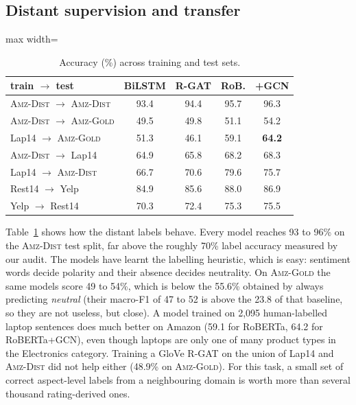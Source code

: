 \documentclass[11pt]{article}
\newcommand{\gold}{\textsc{Amz-Gold}}
\newcommand{\dist}{\textsc{Amz-Dist}}
\begin{document}
\subsection{Distant supervision and transfer}

\begin{table}[t]
\centering
\small
\setlength{\tabcolsep}{3pt}
\begin{adjustbox}{max width=\columnwidth}
\begin{tabular}{lcccc}
\toprule
train $\rightarrow$ test & BiLSTM & R-GAT & RoB. & +GCN \\
\midrule
\dist{} $\rightarrow$ \dist & 93.4 & 94.4 & 95.7 & 96.3 \\
\dist{} $\rightarrow$ \gold & 49.5 & 49.8 & 51.1 & 54.2 \\
Lap14 $\rightarrow$ \gold & 51.3 & 46.1 & 59.1 & \textbf{64.2} \\
\dist{} $\rightarrow$ Lap14 & 64.9 & 65.8 & 68.2 & 68.3 \\
Lap14 $\rightarrow$ \dist & 66.7 & 70.6 & 79.6 & 75.7 \\
\midrule
Rest14 $\rightarrow$ Yelp & 84.9 & 85.6 & 88.0 & 86.9 \\
Yelp $\rightarrow$ Rest14 & 70.3 & 72.4 & 75.3 & 75.5 \\
\bottomrule
\end{tabular}
\end{adjustbox}
\caption{Accuracy (\%) across training and test sets.}
\label{tab:transfer}
\end{table}

Table~\ref{tab:transfer} shows how the distant labels behave. Every model reaches 93 to 96\% on the \dist{} test split, far above the roughly 70\% label accuracy measured by our audit. The models have learnt the labelling heuristic, which is easy: sentiment words decide polarity and their absence decides neutrality. On \gold{} the same models score 49 to 54\%, which is below the 55.6\% obtained by always predicting \textit{neutral} (their macro-F1 of 47 to 52 is above the 23.8 of that baseline, so they are not useless, but close). A model trained on 2,095 human-labelled laptop sentences does much better on Amazon (59.1 for RoBERTa, 64.2 for RoBERTa+GCN), even though laptops are only one of many product types in the Electronics category. Training a GloVe R-GAT on the union of Lap14 and \dist{} did not help either (48.9\% on \gold). For this task, a small set of correct aspect-level labels from a neighbouring domain is worth more than several thousand rating-derived ones.
\end{document}

